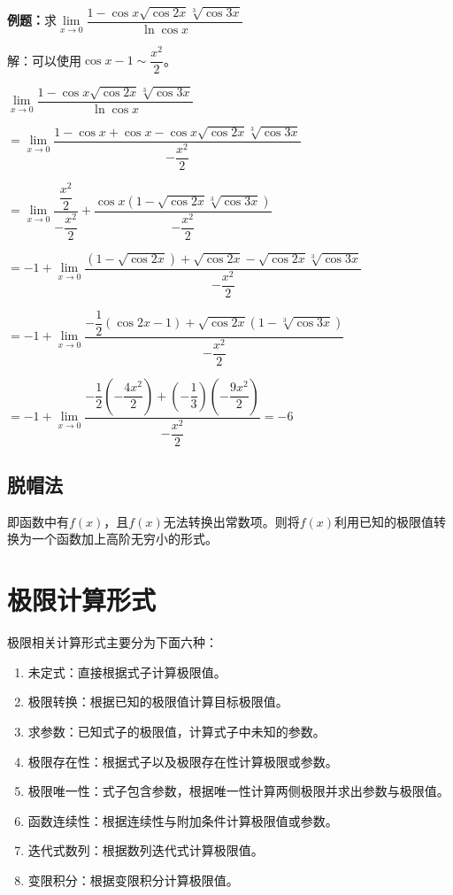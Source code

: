 \textbf{例题：}求$\lim\limits_{x\to 0}\dfrac{1-\cos x\sqrt{\cos 2x}\sqrt[3]{\cos 3x}}{\ln\cos x}$\medskip

解：可以使用$\cos x-1\sim\dfrac{x^2}{2}$。\medskip

$\lim\limits_{x\to 0}\dfrac{1-\cos x\sqrt{\cos 2x}\sqrt[3]{\cos 3x}}{\ln\cos x}$

$=\lim\limits_{x\to 0}\dfrac{1-\cos x+\cos x-\cos x\sqrt{\cos 2x}\sqrt[3]{\cos 3x}}{-\dfrac{x^2}{2}}$

$=\lim\limits_{x\to 0}\dfrac{\dfrac{x^2}{2}}{-\dfrac{x^2}{2}}+\dfrac{\cos x(1-\sqrt{\cos 2x}\sqrt[3]{\cos 3x})}{-\dfrac{x^2}{2}}$

$=-1+\lim\limits_{x\to 0}\dfrac{(1-\sqrt{\cos 2x})+\sqrt{\cos 2x}-\sqrt{\cos 2x}\sqrt[3]{\cos 3x}}{-\dfrac{x^2}{2}}$

$=-1+\lim\limits_{x\to 0}\dfrac{-\dfrac{1}{2}(\cos 2x-1)+\sqrt{\cos 2x}(1-\sqrt[3]{\cos 3x})}{-\dfrac{x^2}{2}}$

$=-1+\lim\limits_{x\to 0}\dfrac{-\dfrac{1}{2}(-\dfrac{4x^2}{2})+\left(-\dfrac{1}{3}\right)\left(-\dfrac{9x^2}{2}\right)}{-\dfrac{x^2}{2}}=-6$

\subsection{脱帽法}

即函数中有$f(x)$，且$f(x)$无法转换出常数项。则将$f(x)$利用已知的极限值转换为一个函数加上高阶无穷小的形式。

\section{极限计算形式}

极限相关计算形式主要分为下面六种：

\begin{enumerate}
    \item 未定式：直接根据式子计算极限值。
    \item 极限转换：根据已知的极限值计算目标极限值。
    \item 求参数：已知式子的极限值，计算式子中未知的参数。
    \item 极限存在性：根据式子以及极限存在性计算极限或参数。
    \item 极限唯一性：式子包含参数，根据唯一性计算两侧极限并求出参数与极限值。
    \item 函数连续性：根据连续性与附加条件计算极限值或参数。
    \item 迭代式数列：根据数列迭代式计算极限值。
    \item 变限积分：根据变限积分计算极限值。
\end{enumerate}

